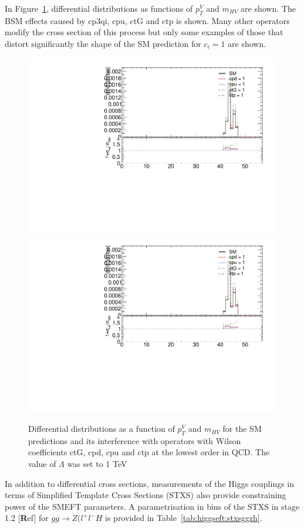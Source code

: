 In Figure~\ref{fig:higgseft:ggzh}, differential distributions as functions of $p_{T}^{V}$ and $m_{HV}$ are shown. The BSM effects caused by cp3qi, cpu, ctG and ctp is shown. Many other operators modify the cross section of this process but only some examples of those that distort significantly the shape of the SM prediction for  $c_i=1$ are shown.

\begin{figure}
\includegraphics[width=0.49\linewidth,page=7]{figures/kinematics_ggHll_np0.pdf}
\includegraphics[width=0.49\linewidth,page=10]{figures/kinematics_ggHll_np0.pdf}
\label{fig:higgseft:ggzh}
\caption{Differential distributions as a function of $p_{T}^{V}$ and $m_{HV}$ for the SM predictions and its interference with operators with Wilson coefficients ctG, cpd, cpu and ctp  at the lowest order in QCD. The value of $\Lambda$ was set to 1 TeV}  
\end{figure}

In addition to differential cross sections, measurements  of the Higgs couplings in terms of Simplified Template Cross Sections (STXS) also provide constraining power of the SMEFT parameters. A parametrisation in bins of the STXS in stage 1.2 [\textbf Ref]  for $gg\to Z(l^{+}l^{-}H$  is provided in Table~\ref{tab:higgseft:stxsggzh}.

